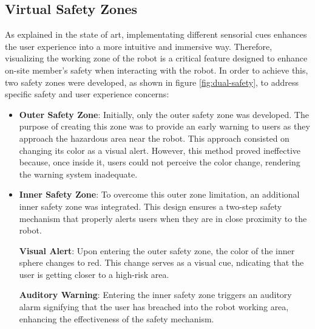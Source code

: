     
\subsection{Virtual Safety Zones}
\label{subsection:virtual-safety-zones} 

As explained in the state of art, implementating different sensorial cues enhances the user experience into a more intuitive and immersive way. Therefore, visualizing the working zone of the robot is a critical feature designed to enhance on-site member's safety when interacting with the robot. In order to achieve this, two safety zones were developed, as shown in figure \ref{fig:dual-safety}, to address specific safety and user experience concerns: 

\begin{itemize}
\item \textbf{Outer Safety Zone}: Initially, only the outer safety zone was developed. The purpose of creating this zone was to provide an 
early warning to users as they approach the hazardous area near the robot. This approach consisted on changing its color as a visual alert. 
However, this method proved ineffective because, once inside it, users could not perceive the color change, rendering the warning system inadequate.

\item \textbf{Inner Safety Zone}: To overcome this outer zone limitation, an additional inner safety zone was integrated. This design ensures a two-step safety mechanism that properly alerts users when they are in close proximity to the robot.

    \textbf{Visual Alert}: Upon entering the outer safety zone, the color of the inner sphere changes to red. This change serves as a visual cue, ndicating that the user is getting closer to a high-risk area.

    \textbf{Auditory Warning}: Entering the inner safety zone triggers an auditory alarm signifying that the user has breached into the robot working area, enhancing the effectiveness of the safety mechanism.
\end{itemize}

